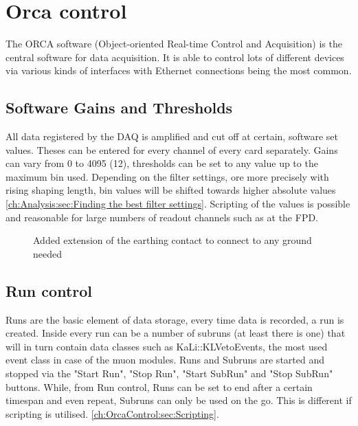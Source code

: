 
  \section{Orca control}
  \label{ch:OrcaControl}
  The ORCA software (Object-oriented Real-time Control and Acquisition) \cite{How09} is the central software for data acquisition. It is able to control lots of different devices via various kinds of interfaces with Ethernet connections being the most common.

    \subsection{Software Gains and Thresholds}
    \label{ch:OrcaControl:sec:SoftwareGainsThresholds}
    All data registered by the DAQ is amplified and cut off at certain, software set values. Theses can be entered for every channel of every card separately. Gains can vary from \SI{0}{} to \SI{4095}{} (\SI{12}{\bit}), thresholds can be set to any value up to the maximum bin used. Depending on the filter settings, ore more precisely with rising shaping length, bin values will be shifted  towards higher absolute values \ref{ch:Analysis:sec:Finding the best filter settings}.
    Scripting of the values is possible and reasonable for large numbers of readout channels such as at the FPD.
    
	\begin{figure}
		\raggedright
		\caption[Multiplug grounding]{Added extension of the earthing contact to connect to any ground needed}
		\label{fig:multiplug}
	\end{figure}
    
    \subsection{Run control}
    \label{ch:OrcaControl:sec:RunControl}
    Runs are the basic element of data storage, every time data is recorded, a run is created. Inside every run can be a number of subruns (at least there is one) that will in turn contain data classes such as KaLi::KLVetoEvents, the most used event class in case of the muon modules. Runs and Subruns are started and stopped via the "Start Run", "Stop Run", "Start SubRun" and "Stop SubRun" buttons. While, from Run control, Runs can be set to end after a certain timespan and even repeat, Subruns can only be used on the go. This is different if scripting is utilised. \ref{ch:OrcaControl:sec:Scripting}.
    
